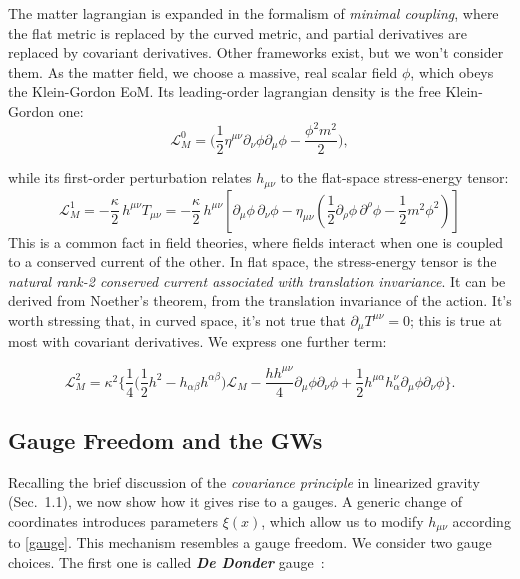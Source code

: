 \documentclass[12pt,a4paper,oneside]{article}
\numberwithin{equation}{section}   %
\begin{document}
The matter lagrangian is expanded in the formalism
of \textit{minimal coupling}, where the flat metric is replaced
by the curved metric, and partial derivatives are replaced by covariant derivatives. Other
frameworks exist, but we won't consider them.
As the matter field, we choose a massive, real scalar field $\phi$, which
obeys the Klein-Gordon EoM. 
Its leading-order lagrangian density is the free Klein-Gordon one:
\begin{equation}
\boxed{\mathcal{L}_M^{0}
= \Big(\frac{1}{2}\eta^{\mu\nu}\partial_\nu \phi \partial_\mu \phi - \frac{\phi^2m^2}{2}\Big),}
\end{equation}


 while its first-order perturbation relates $h_{\mu\nu}$ to the flat-space stress-energy tensor:
\begin{equation}
\boxed{
\mathcal{L}_M^{1} = -\frac{\kappa}{2} \, h^{\mu\nu}T_{\mu\nu}
=
-\frac{\kappa}{2} \, h^{\mu\nu}
\left[
\partial_\mu \phi\, \partial_\nu \phi
- \eta_{\mu\nu}\left(\frac12 \partial_\rho \phi\, \partial^\rho \phi - \frac12 m^2 \phi^2\right)
\right]
}
\end{equation}
This is a common fact in field theories, where fields interact
when one is coupled to a conserved current of the other. 
In flat space,
 the stress-energy tensor is the \textit{natural rank-2 conserved current associated with
 translation invariance}. 
 It can be derived from Noether's theorem, from
 the translation invariance of the action.
  It's worth stressing that, in curved space, it's not
  true that $\partial_\mu T^{\mu\nu}=0$;
   this is true at most with covariant derivatives. 
  We express one further term:

  
  
\begin{equation}
\boxed{
\mathcal{L}^{2}_M=\kappa^2 \Biggl\{
\frac{1}{4}\bigl(\frac12h^2-h_{\alpha\beta}h^{\alpha\beta}\bigr)\mathcal{L}_M - \frac{hh^{\mu\nu}}
{4}\partial_\mu\phi\partial_\nu\phi + \frac{1}{2}h^{\mu\alpha}h_\alpha^\nu \partial_\mu\phi\partial_\nu\phi
\Biggr\}.
}
\end{equation}

 
\subsection{Gauge Freedom and the GWs}
Recalling the brief discussion of the \textit{covariance principle} in
linearized gravity (Sec.~1.1), we now show how it gives rise to a gauges.
A generic change of coordinates introduces
 parameters $\xi (x)$,
which allow us to modify $h_{\mu\nu}$ according to \eqref{gauge}. This mechanism
resembles a gauge freedom. We consider two gauge choices. The first one is called
\textbf{\textit{De Donder}} gauge~\cite{Maggiore2008}:
\end{document}
